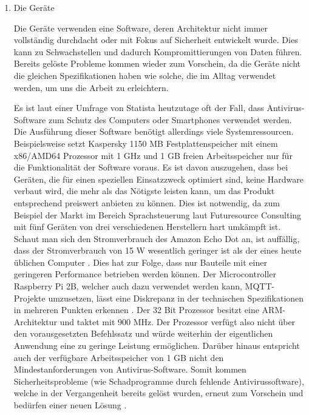         \begin{enumerate}
            \item Die Geräte
            
            Die Geräte verwenden eine Software, deren Architektur nicht immer vollständig durchdacht oder mit Fokus auf Sicherheit entwickelt wurde. Dies kann zu Schwachstellen und dadurch Kompromittierungen von Daten führen. Bereits gelöste Probleme kommen wieder zum Vorschein, da die Geräte nicht die gleichen Spezifikationen haben wie solche, die im Alltag verwendet werden, um uns die Arbeit zu erleichtern. 
        
            Es ist laut einer Umfrage von Statista \cite{kaspersky_lab_2019}
            heutzutage oft der Fall, dass Antivirus-Software zum Schutz des Computers oder Smartphones verwendet werden. Die Ausführung dieser Software benötigt allerdings viele Systemressourcen.
            Beispielsweise setzt Kaspersky \cite{ao_kaspersky_lab_2018_1}
            1150 MB Festplattenspeicher mit einem x86/AMD64 Prozessor mit 1 GHz und 1 GB freien Arbeitsspeicher nur für die Funktionalität der Software voraus. Es ist davon auszugehen, dass bei Geräten, die für einen speziellen Einsatzzweck optimiert sind, keine Hardware verbaut wird, die mehr als das Nötigste leisten kann, um das Produkt entsprechend preiswert anbieten zu können. Dies ist notwendig, da zum Beispiel der Markt im Bereich Sprachsteuerung laut Futuresource Consulting \cite{futuresource_consulting_ltd_2019} mit fünf Geräten von drei verschiedenen Herstellern hart umkämpft ist. Schaut man sich den Stromverbrauch des Amazon Echo Dot an, ist auffällig, dass der Stromverbrauch von 15 W wesentlich geringer ist als der eines heute üblichen Computer \cite{amazon_de_alle_produkte_2018}. Dies hat zur Folge, dass nur Bauteile mit einer geringeren Performance betrieben werden können.
            Der Microcontroller Raspberry Pi 2B, welcher auch dazu verwendet werden kann, \ac{MQTT}-Projekte umzusetzen, lässt eine Diskrepanz in der technischen Spezifikationen in mehreren Punkten erkennen \cite{raspberry_pi_foundation_2016}. Der 32 Bit Prozessor besitzt eine \ac{ARM}-Architektur und taktet mit 900 MHz. Der Prozessor verfügt also nicht über den vorausgesetzten Befehlssatz und würde weiterhin der eigentlichen Anwendung eine zu geringe Leistung ermöglichen. Darüber hinaus entspricht auch der verfügbare Arbeitsspeicher von 1 GB nicht den Mindestanforderungen von Antivirus-Software.
            Somit kommen Sicherheitsprobleme (wie Schadprogramme durch fehlende Antivirussoftware), welche in der Vergangenheit bereits gelöst wurden, erneut zum Vorschein und bedürfen einer neuen Lösung \cite{6978614}.
            

\end{enumerate}
